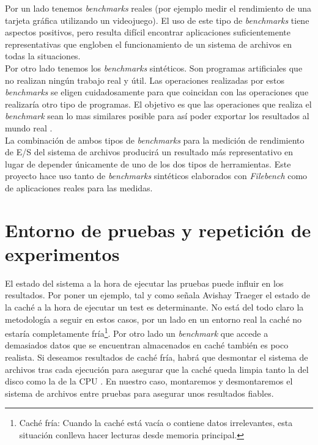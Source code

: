 Por un lado tenemos \textit{benchmarks} reales (por ejemplo medir el rendimiento de una tarjeta gráfica utilizando un videojuego). El uso de este tipo de \textit{benchmarks} tiene aspectos positivos, pero resulta difícil encontrar aplicaciones suficientemente representativas que engloben el funcionamiento de un sistema de archivos en todas la situaciones.\\

Por otro lado tenemos los \textit{benchmarks} sintéticos. Son programas artificiales que no realizan ningún trabajo real y útil. Las operaciones realizadas por estos \textit{benchmarks} se eligen cuidadosamente para que coincidan con las operaciones que realizaría otro tipo de programas. El objetivo es que las operaciones que realiza el \textit{benchmark} sean lo mas similares posible para así poder exportar los resultados al mundo real \cite{lilja_2000}.\\

La combinación de ambos tipos de \textit{benchmarks} para la medición de rendimiento de E/S del sistema de archivos producirá un resultado más representativo en lugar de depender únicamente de uno de los dos tipos de herramientas. Este proyecto hace uso tanto de \textit{benchmarks} sintéticos elaborados con \textit{Filebench} como de aplicaciones reales para las medidas.

\section{Entorno de pruebas y repetición de experimentos}
El estado del sistema a la hora de ejecutar las pruebas puede influir en los resultados. Por poner un ejemplo, tal y como señala Avishay Traeger \cite{traeger} el estado de la caché a la hora de ejecutar un test es determinante. No está del todo claro la metodología a seguir en estos casos, por un lado en un entorno real la caché no estaría completamente fría\footnote{Caché fría: Cuando la caché está vacía o contiene datos irrelevantes, esta situación conlleva hacer lecturas desde memoria principal.}. Por otro lado un \textit{benchmark} que accede a demasiados datos que se encuentran almacenados en caché también es poco realista. Si deseamos resultados de caché fría, habrá que desmontar el sistema de archivos tras cada ejecución para asegurar que la caché queda limpia tanto la del disco como la de la CPU \cite{traeger}. En nuestro caso, montaremos y desmontaremos el sistema de archivos entre pruebas para asegurar unos resultados fiables.\\

